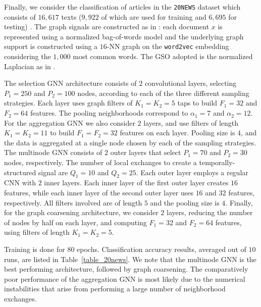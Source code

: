 Finally, we consider the classification of articles in the \texttt{20NEWS} dataset which consists of $16,617$ texts ($9,922$ of which are used for training and $6,695$ for testing) \cite{joachims96-20news}. The graph signals are constructed as in \cite{defferrard17-cnngraphs}: each document $x$ is represented using a normalized bag-of-words model and the underlying graph support is constructed using a $16$-NN graph on the \texttt{word2vec} embedding \cite{mikolov13-word2vec} considering the $1,000$ most common words. The GSO adopted is the normalized Laplacian as in \cite{defferrard17-cnngraphs}.

The selection GNN architecture consists of $2$ convolutional layers, selecting $P_{1}=250$ and $P_{2} = 100$ nodes, according to each of the three different sampling strategies. Each layer uses graph filters of $K_{1}=K_{2}=5$ taps to build $F_{1}=32$ and $F_{2}=64$ features. The pooling neighborhoods correspond to $\alpha_{1}=7$ and $\alpha_{2}=12$. For the aggregation GNN we also consider $2$ layers, and use filters of length $K_{1}=K_{2}=11$ to build $F_{1}=F_{2}=32$ features on each layer. Pooling size is $4$, and the data is aggregated at a single node chosen by each of the sampling strategies. The multinode GNN consists of $2$ outer layers that select $P_{1}=70$ and $P_{2}=30$ nodes, respectively. The number of local exchanges to create a temporally-structured signal are $Q_{1} = 10$ and $Q_{2}=25$. Each outer layer employs a regular CNN with $2$ inner layers. Each inner layer of the first outer layer creates $16$ features, while each inner layer of the second outer layer uses $16$ and $32$ features, respectively. All filters involved are of length $5$ and the pooling size is $4$. Finally, for the graph coarsening architecture, we consider $2$ layers, reducing the number of nodes by half on each layer, and computing $F_{1}=32$ and $F_{2}=64$ features, using filters of length $K_{1}=K_{2}=5$.

Training is done for $80$ epochs. Classification accuracy results, averaged out of $10$ runs, are listed in Table~\ref{table_20news}. We note that the multinode GNN is the best performing architecture, followed by graph coarsening. The comparatively poor performance of the aggregation GNN is most likely due to the numerical instabilities that arise from performing a large number of neighborhood exchanges.
